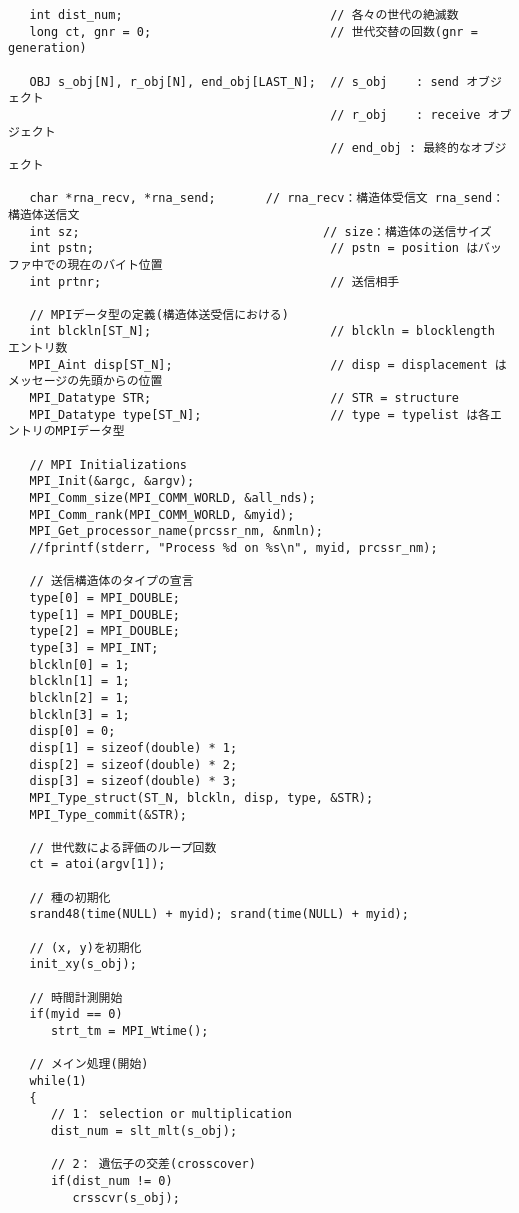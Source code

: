 \documentclass[a4paper,titlepage]{jreport}
\begin{document}
\begin{verbatim}
   int dist_num;                             // 各々の世代の絶滅数
   long ct, gnr = 0;                         // 世代交替の回数(gnr = generation)

   OBJ s_obj[N], r_obj[N], end_obj[LAST_N];  // s_obj    : send オブジェクト
                                             // r_obj    : receive オブジェクト
                                             // end_obj : 最終的なオブジェクト

   char *rna_recv, *rna_send;       // rna_recv：構造体受信文 rna_send：構造体送信文
   int sz;                                  // size：構造体の送信サイズ
   int pstn;                                 // pstn = position はバッファ中での現在のバイト位置
   int prtnr;                                // 送信相手

   // MPIデータ型の定義(構造体送受信における)
   int blckln[ST_N];                         // blckln = blocklength エントリ数
   MPI_Aint disp[ST_N];                      // disp = displacement はメッセージの先頭からの位置
   MPI_Datatype STR;                         // STR = structure
   MPI_Datatype type[ST_N];                  // type = typelist は各エントリのMPIデータ型

   // MPI Initializations
   MPI_Init(&argc, &argv);
   MPI_Comm_size(MPI_COMM_WORLD, &all_nds);
   MPI_Comm_rank(MPI_COMM_WORLD, &myid);
   MPI_Get_processor_name(prcssr_nm, &nmln);
   //fprintf(stderr, "Process %d on %s\n", myid, prcssr_nm);

   // 送信構造体のタイプの宣言
   type[0] = MPI_DOUBLE;
   type[1] = MPI_DOUBLE;
   type[2] = MPI_DOUBLE;
   type[3] = MPI_INT;
   blckln[0] = 1;
   blckln[1] = 1;
   blckln[2] = 1;
   blckln[3] = 1;
   disp[0] = 0;
   disp[1] = sizeof(double) * 1;
   disp[2] = sizeof(double) * 2;
   disp[3] = sizeof(double) * 3;
   MPI_Type_struct(ST_N, blckln, disp, type, &STR);
   MPI_Type_commit(&STR);

   // 世代数による評価のループ回数
   ct = atoi(argv[1]);

   // 種の初期化
   srand48(time(NULL) + myid); srand(time(NULL) + myid);

   // (x, y)を初期化
   init_xy(s_obj);

   // 時間計測開始
   if(myid == 0)
      strt_tm = MPI_Wtime();

   // メイン処理(開始)
   while(1)
   {
      // 1： selection or multiplication
      dist_num = slt_mlt(s_obj);

      // 2： 遺伝子の交差(crosscover)
      if(dist_num != 0)
         crsscvr(s_obj);


\end{verbatim}
\end{document}
